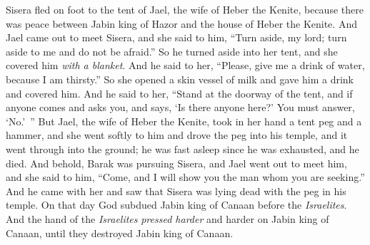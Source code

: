 \begin{biblechapter}
\verse Sisera fled on foot to the tent of Jael, the wife of Heber the Kenite, because there was peace between Jabin king of Hazor and the house of Heber the Kenite.
\verse And Jael came out to meet Sisera, and she said to him, “Turn aside, my lord; turn aside to me and do not be afraid.” So he turned aside into her tent, and she covered him \textit{with a blanket}.
\verse And he said to her, “Please, give me a drink of water, because I am thirsty.” So she opened a skin vessel of milk and gave him a drink and covered him.
\verse And he said to her, “Stand at the doorway of the tent, and if anyone comes and asks you, and says, ‘Is there anyone here?’ You must answer, ‘No.’ ”
\verse But Jael, the wife of Heber the Kenite, took in her hand a tent peg and a hammer, and she went softly to him and drove the peg into his temple, and it went through into the ground; he was fast asleep since he was exhausted, and he died.
\verse And behold, Barak was pursuing Sisera, and Jael went out to meet him, and she said to him, “Come, and I will show you the man whom you are seeking.” And he came with her and saw that Sisera was lying dead with the peg in his temple.
\verse On that day God subdued Jabin king of Canaan before the \textit{Israelites}.
\verse And the hand of the \textit{Israelites} \textit{pressed harder} and harder on Jabin king of Canaan, until they destroyed Jabin king of Canaan.
\end{biblechapter}

